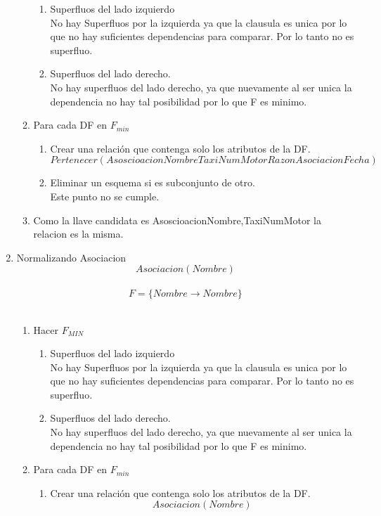 \documentclass{article}
\begin{document}
\begin{enumerate}
\begin{enumerate}
				\begin{enumerate}
					\item Superfluos del lado izquierdo\\
					No hay Superfluos por la izquierda ya que la clausula es unica por lo que no hay suficientes dependencias para comparar.
					Por lo tanto no es superfluo.\\
					\item Superfluos del lado derecho.\\
					No hay superfluos del lado derecho, ya que nuevamente al ser unica la dependencia no hay tal posibilidad por lo que F es minimo.
				\end{enumerate}
				\item Para cada DF en $F_{min}$
				\begin{enumerate}
					\item Crear una relación que contenga solo los atributos de la DF.
					$$Pertenecer(AsoscioacionNombre TaxiNumMotor RazonAsociacion Fecha)$$
					
					\item Eliminar un esquema si es subconjunto de otro.\\
					Este punto no se cumple.
				\end{enumerate}						
				\item Como la llave candidata es AsoscioacionNombre,TaxiNumMotor la relacion es la misma.
			\end{enumerate}
			\item  Normalizando Asociacion\\			
			$$Asociacion(Nombre)$$\\
			$$F = \lbrace Nombre\rightarrow Nombre\rbrace$$\\
			\begin{enumerate}
				\item Hacer $F_{MIN}$\\
				
				\begin{enumerate}
					\item Superfluos del lado izquierdo\\
					No hay Superfluos por la izquierda ya que la clausula es unica por lo que no hay suficientes dependencias para comparar.
					Por lo tanto no es superfluo.\\
					\item Superfluos del lado derecho.\\
					No hay superfluos del lado derecho, ya que nuevamente al ser unica la dependencia no hay tal posibilidad por lo que F es minimo.
				\end{enumerate}
				\item Para cada DF en $F_{min}$
				\begin{enumerate}
					\item Crear una relación que contenga solo los atributos de la DF.
					$$Asociacion(Nombre)$$
					

\end{enumerate}
\end{enumerate}
\end{enumerate}
\end{document}
